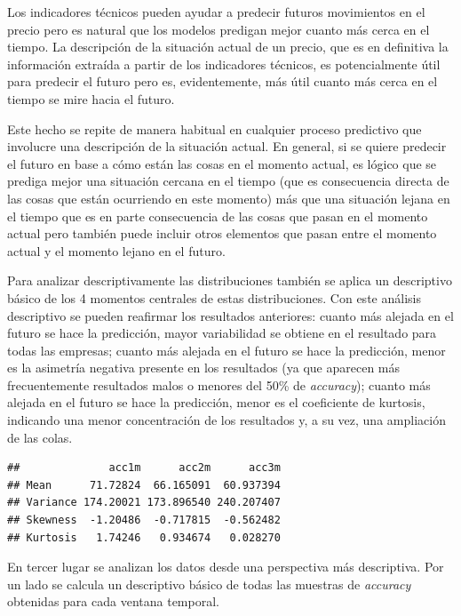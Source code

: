 \documentclass[]{DissertateUSU}
\begin{document}
\noindent Los indicadores técnicos pueden ayudar a predecir futuros
movimientos en el precio pero es natural que los modelos predigan mejor
cuanto más cerca en el tiempo. La descripción de la situación actual de
un precio, que es en definitiva la información extraída a partir de los
indicadores técnicos, es potencialmente útil para predecir el futuro
pero es, evidentemente, más útil cuanto más cerca en el tiempo se mire
hacia el futuro.

\noindent Este hecho se repite de manera habitual en cualquier proceso
predictivo que involucre una descripción de la situación actual. En
general, si se quiere predecir el futuro en base a cómo están las cosas
en el momento actual, es lógico que se prediga mejor una situación
cercana en el tiempo (que es consecuencia directa de las cosas que están
ocurriendo en este momento) más que una situación lejana en el tiempo
que es en parte consecuencia de las cosas que pasan en el momento actual
pero también puede incluir otros elementos que pasan entre el momento
actual y el momento lejano en el futuro.

\noindent Para analizar descriptivamente las distribuciones también se
aplica un descriptivo básico de los 4 momentos centrales de estas
distribuciones. Con este análisis descriptivo se pueden reafirmar los
resultados anteriores: cuanto más alejada en el futuro se hace la
predicción, mayor variabilidad se obtiene en el resultado para todas las
empresas; cuanto más alejada en el futuro se hace la predicción, menor
es la asimetría negativa presente en los resultados (ya que aparecen más
frecuentemente resultados malos o menores del 50\% de \emph{accuracy});
cuanto más alejada en el futuro se hace la predicción, menor es el
coeficiente de kurtosis, indicando una menor concentración de los
resultados y, a su vez, una ampliación de las colas.

\begin{verbatim}
##              acc1m      acc2m      acc3m
## Mean      71.72824  66.165091  60.937394
## Variance 174.20021 173.896540 240.207407
## Skewness  -1.20486  -0.717815  -0.562482
## Kurtosis   1.74246   0.934674   0.028270
\end{verbatim}

\setlength\parskip{5ex}
\justifying

\noindent En tercer lugar se analizan los datos desde una perspectiva
más descriptiva. Por un lado se calcula un descriptivo básico de todas
las muestras de \emph{accuracy} obtenidas para cada ventana temporal.
\end{document}
